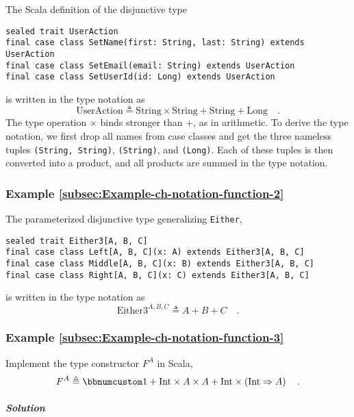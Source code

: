 The Scala definition of the disjunctive type
\begin{lstlisting}
sealed trait UserAction
final case class SetName(first: String, last: String) extends UserAction
final case class SetEmail(email: String) extends UserAction
final case class SetUserId(id: Long) extends UserAction
\end{lstlisting}
is written in the type notation as
\[
\text{UserAction}\triangleq\text{String}\times\text{String}+\text{String}+\text{Long}\quad.
\]
The type operation $\times$ binds stronger than $+$, as in arithmetic.
To derive the type notation, we first drop all names from case classes
and get the three nameless tuples \lstinline!(String, String)!,
\lstinline!(String)!, and
\lstinline!(Long)!. Each
of these tuples is then converted into a product, and all products
are summed in the type notation.

\subsubsection{Example \label{subsec:Example-ch-notation-function-2}\ref{subsec:Example-ch-notation-function-2}}

The parameterized disjunctive type generalizing \lstinline!Either!,
\begin{lstlisting}
sealed trait Either3[A, B, C]
final case class Left[A, B, C](x: A) extends Either3[A, B, C]
final case class Middle[A, B, C](x: B) extends Either3[A, B, C]
final case class Right[A, B, C](x: C) extends Either3[A, B, C]
\end{lstlisting}
is written in the type notation as
\[
\text{Either3}^{A,B,C}\triangleq A+B+C\quad.
\]


\subsubsection{Example \label{subsec:Example-ch-notation-function-3}\ref{subsec:Example-ch-notation-function-3}}

Implement the type constructor $F^{A}$ in Scala,
\[
F^{A}\triangleq\bbnum 1+\text{Int}\times A\times A+\text{Int}\times\left(\text{Int}\Rightarrow A\right)\quad.
\]


\subparagraph{Solution}

